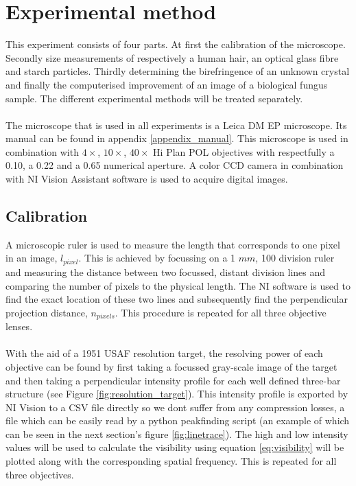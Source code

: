 \section{Experimental method}

This experiment consists of four parts. At first the calibration of the microscope. Secondly size measurements of respectively a human hair, an optical glass fibre and starch particles. Thirdly determining the birefringence of an unknown crystal and finally the computerised improvement of an image of a biological fungus sample. The different experimental methods will be treated separately.\\
\\
The microscope that is used in all experiments is a Leica DM EP microscope. Its manual can be found in appendix \ref{appendix_manual}. This microscope is used in combination with $4\times$, $10\times$, $40\times$ Hi Plan POL objectives with respectfully a 0.10, a 0.22 and a 0.65 numerical aperture. A color CCD camera in combination with NI Vision Assistant software is used to acquire digital images.

\subsection{Calibration}
\label{expmeth_calibration}
A microscopic ruler is used to measure the length that corresponds to one pixel in an image, $l_{pixel}$. This is achieved by focussing on a 1 $mm$, 100 division ruler and measuring the distance between two focussed, distant division lines and comparing the number of pixels to the physical length. The NI software is used to find the exact location of these two lines and subsequently find the perpendicular projection distance, $n_{pixels}$. This procedure is repeated for all three objective lenses.\\
\\
With the aid of a 1951 USAF resolution target, the resolving power of each objective can be found by first taking a focussed gray-scale image of the target and then taking a perpendicular intensity profile for each well defined three-bar structure (see Figure \ref{fig:resolution_target}). This intensity profile is exported by NI Vision to a CSV file directly so we dont suffer from any compression losses, a file which can be easily read by a python peakfinding script (an example of which can be seen in the next section's figure \ref{fig:linetrace}). The high and low intensity values will be used to calculate the visibility using equation \ref{eq:visibility} will be plotted along with the corresponding spatial frequency. This is repeated for all three objectives.\\

